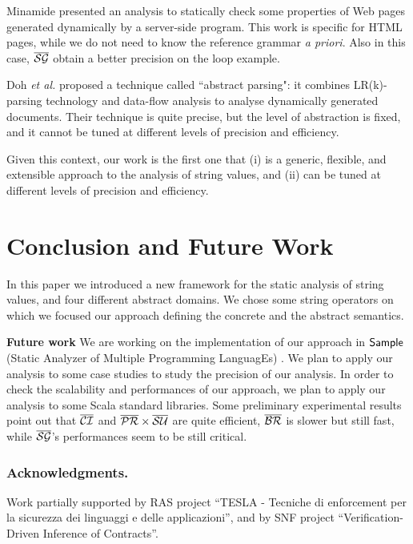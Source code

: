 \documentclass[orivec]{llncs}
\begin{document}
Minamide \cite{MIN05} presented an analysis to statically check some properties of Web pages generated dynamically by a server-side program. This work is specific for HTML pages, while we do not need to know the reference grammar \textit{a priori}. Also in this case, $\mathsf{\overline{\mathsf{\mathcal{SG}}}}$ obtain a better precision on the loop example.

Doh \emph{et al.} \cite{DOH09} proposed a technique called ``abstract parsing": it combines LR(k)-parsing technology and data-flow analysis to analyse  dynamically generated documents. Their technique is quite precise, but the level of abstraction is fixed, and it cannot be tuned at different levels of precision and efficiency.

Given this context, our work is the first one that (i) is a generic, flexible, and extensible approach to the analysis of string values, and (ii) can be tuned at different levels of precision and efficiency.

 
 
\section{Conclusion and Future Work}
\label{sect:conclusion}
In this paper we introduced a new framework for the static analysis of string values, and four different abstract domains. We chose some string operators on which we focused our approach defining the concrete and the abstract semantics.

\noindent \textbf{Future work} We are working on the implementation of our approach in $\mathsf{Sample}$ (Static Analyzer of Multiple Programming LanguagEs) \cite{FER10}. We plan to apply our analysis to some case studies to study the precision of our analysis. In order to check the scalability and performances of our approach, we plan to apply our analysis to some Scala standard libraries. Some preliminary experimental results point out that $\mathsf{\overline{\mathsf{\mathcal{CI}}}}$ and $\mathsf{\overline{\mathsf{\mathcal{PR}}}} \times \mathsf{\overline{\mathsf{\mathcal{SU}}}}$ are quite efficient, $\mathsf{\overline{\mathsf{\mathcal{BR}}}}$ is slower but still fast, while $\mathsf{\overline{\mathsf{\mathcal{SG}}}}$'s performances seem to be still critical.
\subsubsection*{Acknowledgments.} Work partially supported by RAS project \textquotedblleft TESLA - Tecniche di enforcement per la sicurezza dei linguaggi e delle applicazioni\textquotedblright, and by SNF project \textquotedblleft Verification-Driven Inference of Contracts\textquotedblright.



\end{document}
